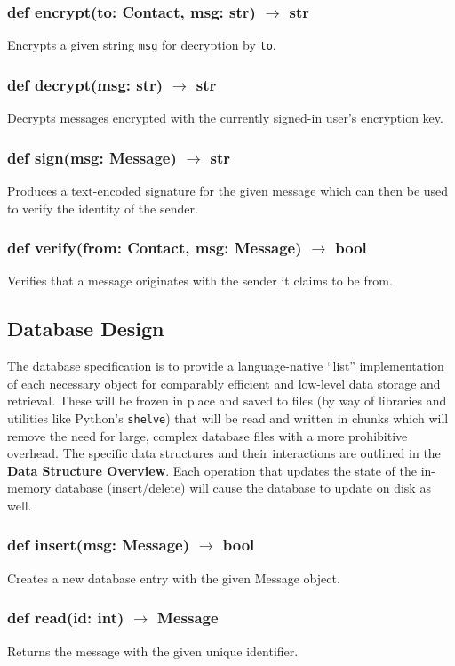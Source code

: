 \documentclass[titlepage]{report}
\begin{document}
\subsubsection{def encrypt(to: Contact, msg: str) $\rightarrow$ str}
Encrypts a given string \texttt{msg} for decryption by \texttt{to}.
\subsubsection{def decrypt(msg: str) $\rightarrow$ str}
Decrypts messages encrypted with the currently signed-in user's encryption key.
\subsubsection{def sign(msg: Message) $\rightarrow$ str}
Produces a text-encoded signature for the given message which can then be used to verify the identity of the sender.
\subsubsection{def verify(from: Contact, msg: Message) $\rightarrow$ bool}
Verifies that a message originates with the sender it claims to be from.

\subsection{Database Design}
The database specification is to provide a language-native ``list'' implementation of each necessary object for comparably efficient and low-level data storage and retrieval. These will be frozen in place and saved to files (by way of libraries and utilities like Python's \texttt{shelve}) that will be read and written in chunks which will remove the need for large, complex database files with a more prohibitive overhead. The specific data structures and their interactions are outlined in the \textbf{Data Structure Overview}. Each operation that updates the state of the in-memory database (insert/delete) will cause the database to update on disk as well.

\subsubsection{def insert(msg: Message) $\rightarrow$ bool}
Creates a new database entry with the given Message object.
\subsubsection{def read(id: int) $\rightarrow$ Message}
Returns the message with the given unique identifier.
\end{document}
